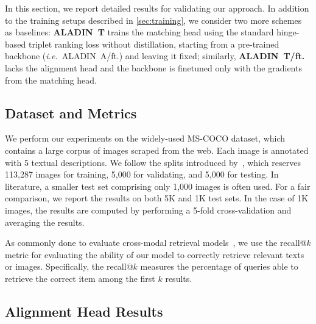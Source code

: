 \documentclass[sigconf]{acmart}
\def \ie {\emph{i.e.}}
\newcommand{\ourmodel}{ALADIN}    \settopmatter{authorsperrow=4}
\begin{document}
In this section, we report detailed results for validating our approach.
In addition to the training setups described in \ref{sec:training}, we consider two more schemes as baselines: \textbf{\ourmodel\ T} trains the matching head using the standard hinge-based triplet ranking loss without distillation, starting from a pre-trained backbone (\ie~\ourmodel\ A/ft.) and leaving it fixed; similarly, \textbf{\ourmodel\ T/ft.} lacks the alignment head and the backbone is finetuned only with the gradients from the matching head.


\subsection{Dataset and Metrics}
We perform our experiments on the widely-used MS-COCO dataset, which contains a large corpus of images scraped from the web. Each image is annotated with 5 textual descriptions. We follow the splits introduced by~\citep{karpathy2015alignment}, which reserves 113,287 images for training, 5,000 for validating, and 5,000 for testing. In literature, a smaller test set comprising only 1,000 images is often used. For a fair comparison, we report the results on both 5K and 1K test sets. In the case of 1K images, the results are computed by performing a 5-fold cross-validation and averaging the results.

As commonly done to evaluate cross-modal retrieval models~\citep{vsepp2018faghri,li2019,qi2020imagebert,lu2019vilbert,lee2019}, we use the recall@$k$ metric for evaluating the ability of our model to correctly retrieve relevant texts or images. Specifically, the recall@$k$ measures the percentage of queries able to retrieve the correct item among the first $k$ results.



\subsection{Alignment Head Results}
\end{document}
